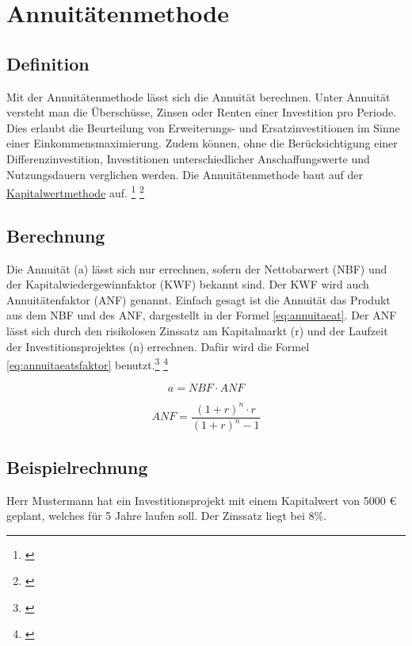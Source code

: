 \chapter{Annuitätenmethode}
\label{Annuitaetenmethode}

\section{Definition}

Mit der Annuitätenmethode lässt sich die Annuität berechnen. Unter Annuität versteht man die Überschüsse, Zinsen oder Renten einer Investition pro Periode. Dies erlaubt die Beurteilung von Erweiterungs- und Ersatzinvestitionen im Sinne einer Einkommensmaximierung. Zudem können, ohne die Berücksichtigung einer Differenzinvestition, Investitionen unterschiedlicher Anschaffungswerte und Nutzungsdauern verglichen werden. Die Annuitätenmethode baut auf der \hyperref[Kapitalwertmethode]{Kapitalwertmethode} auf. \footnote{\cite{bwllexicon-annu}} \footnote{\cite{wikipedia-annu}}

\section{Berechnung}

Die Annuität (a) lässt sich nur errechnen, sofern der Nettobarwert (NBF) und der Kapitalwiedergewinnfaktor (KWF) bekannt sind. Der KWF wird auch Annuitätenfaktor (ANF) genannt. Einfach gesagt ist die Annuität das Produkt aus dem NBF und des ANF, dargestellt in der Formel \eqref{eq:annuitaeat}. Der ANF lässt sich durch den risikolosen Zinssatz am Kapitalmarkt (r) und der Laufzeit der Investitionsprojektes (n) errechnen. Dafür wird die Formel \eqref{eq:annuitaeatsfaktor} benutzt.\footnote{\cite{studyflix-annu}} \footnote{\cite{bwllexicon-annu}}

\begin{equation}
    a = NBF \cdot ANF
    \label{eq:annuitaeat}
\end{equation}

\begin{equation}
    ANF = \frac{ (1 + r)^n \cdot r }{ (1 + r)^n - 1 }
    \label{eq:annuitaeatsfaktor}
\end{equation}

\section{Beispielrechnung}

Herr Mustermann hat ein Investitionsprojekt mit einem Kapitalwert von 5000 € geplant, welches für 5 Jahre laufen soll. Der Zinssatz liegt bei 8\%.


